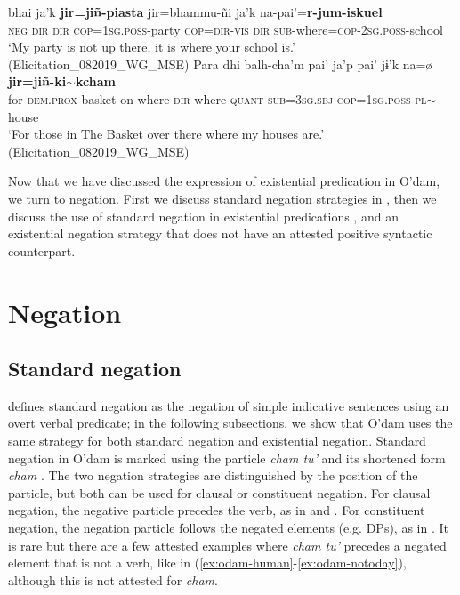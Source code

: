 \documentclass[output=paper]{langsci/langscibook}
\begin{document}
\ea
\label{ex:odam-mypartysch}
 bhai ja'k \textbf{jir=jiñ-piasta} jir=bhammu-\~ni ja'k na-pai’=\textbf{r-jum-iskuel}\\
\textsc{neg} \textsc{dir} \textsc{dir} \textsc{cop=1sg.poss-}party \textsc{cop=dir-vis} \textsc{dir} \textsc{sub}-where=\textsc{cop-2sg.poss}-school\\
\glt ‘My party is not up there, it is where your school is.’ (Elicitation\_082019\_WG\_MSE)
\z 
\ea
\label{ex:odam-mybask}
\gll Para 	dhi 	balh-cha'm     		pai'  	ja'p 	pai'    	jɨ'k 	{na=\o}	{\textbf{jir=jiñ-ki$\sim$kcham}}\\
	for  	\textsc{dem.prox} 	basket-on 	where 	\textsc{dir} 	where  \textsc{quant} 	\textsc{sub=3sg.sbj} 	\textsc{cop=1sg.poss-pl}$\sim$house\\
\glt ‘For those in The Basket over there where my houses are.’ (Elicitation\_082019\_WG\_MSE)
\z 

Now that we have discussed the expression of existential predication in
O'dam, we turn to negation. First we discuss standard negation strategies
in , then we discuss the use of standard negation
in existential predications , and an existential negation strategy that does not have an attested positive syntactic counterpart.
\section{Negation}
\label{sec:odam-negation}
\subsection{Standard negation}
\label{sec:odam-staneg}
\citet{Miestamo2005-o} defines standard negation as the negation of simple indicative sentences using an overt verbal predicate; in the following subsections, we show that O’dam uses the same strategy for both standard negation and existential negation. Standard negation in O’dam is marked using the particle \emph{cham tu’} and its shortened form \emph{cham} \citep[109]{garcia2014}. The two negation strategies are distinguished by the position of the particle, but both can be used for clausal or constituent negation. For clausal negation, the negative particle precedes the verb, as in  and . For constituent negation, the negation particle follows the negated elements (e.g. DPs), as in . It is rare but there are a few attested examples where \emph{cham tu’} precedes a negated element that is not a verb, like in (\ref{ex:odam-human}-\ref{ex:odam-notoday}), although this is not attested for \emph{cham}.
\end{document}
